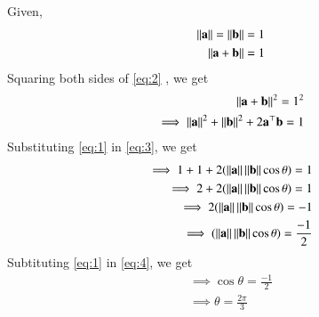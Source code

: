 Given,
\begin{align}
	\norm{\vec{a}}=\norm{\vec{b}}=1\label{eq:1}
	\\
	\norm{\vec{a}+\vec{b}}=1\label{eq:2}
\end{align}
Squaring both sides of \eqref{eq:2}  , we get
\begin{align}
	\norm{\vec{a}+\vec{b}}^2=1^2
\\	
	\implies \norm{\vec{a}}^2 + \norm{\vec{b}}^2 + 2\vec{a}^{\top}\vec{b} = 1\label{eq:3}	
\end{align}
Substituting \eqref{eq:1} in \eqref{eq:3}, we get
\\
\begin{align}
	\implies 1+1+2(\norm{\vec{a}}\norm{\vec{b}}\cos{\theta})=1
	\\
	\implies 2+2(\norm{\vec{a}}\norm{\vec{b}}\cos{\theta})=1
        \\
	\implies 2(\norm{\vec{a}}\norm{\vec{b}}\cos{\theta})=-1
	\\
	\implies (\norm{\vec{a}}\norm{\vec{b}}\cos{\theta})=\frac{-1}{2}\label{eq:4}
\end{align}
Subtituting \eqref{eq:1} in \eqref{eq:4}, we get
\begin{align}
	\implies \cos{\theta}=\frac{-1}{2}
	\\
	\implies \theta=\frac{2\pi}{3}
\end{align}
